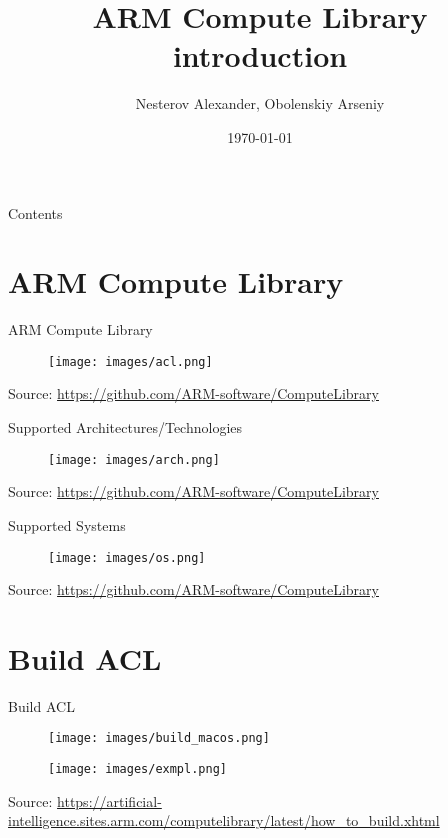 \documentclass{beamer}
\title[ARM Compute Library introduction]{ARM Compute Library introduction}
\author{Nesterov Alexander, Obolenskiy Arseniy}
\institute{ITLab}
\date{\today}
\begin{document}
\begin{frame}
    \titlepage
\end{frame}

\begin{frame}{Contents}
    \tableofcontents
\end{frame}

\section{ARM Compute Library}
\begin{frame}{ARM Compute Library}
  \begin{figure}[h]
    \texttt{[image: images/acl.png]}
  \end{figure}
  \footnotesize Source: \href{https://github.com/ARM-software/ComputeLibrary}{https://github.com/ARM-software/ComputeLibrary}
\end{frame}

\begin{frame}{Supported Architectures/Technologies}
  \begin{figure}[h]
    \texttt{[image: images/arch.png]}
  \end{figure}
  \footnotesize Source: \href{https://github.com/ARM-software/ComputeLibrary}{https://github.com/ARM-software/ComputeLibrary}
\end{frame}

\begin{frame}{Supported Systems}
  \begin{figure}[h]
    \texttt{[image: images/os.png]}
  \end{figure}
  \footnotesize Source: \href{https://github.com/ARM-software/ComputeLibrary}{https://github.com/ARM-software/ComputeLibrary}
\end{frame}

\section{Build ACL}
\begin{frame}{Build ACL}
  \begin{figure}[h]
    \texttt{[image: images/build\_macos.png]}
  \end{figure}
  \begin{figure}[h]
    \texttt{[image: images/exmpl.png]}
  \end{figure}
  \footnotesize Source: \href{https://artificial-intelligence.sites.arm.com/computelibrary/latest/how_to_build.xhtml}{https://artificial-intelligence.sites.arm.com/computelibrary/latest/how\_to\_build.xhtml}
\end{frame}
\end{document}
